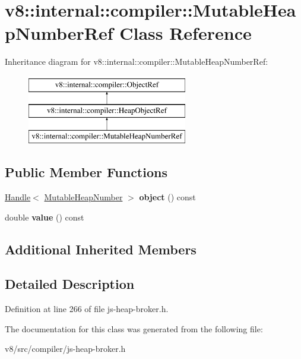 \hypertarget{classv8_1_1internal_1_1compiler_1_1MutableHeapNumberRef}{}\section{v8\+:\+:internal\+:\+:compiler\+:\+:Mutable\+Heap\+Number\+Ref Class Reference}
\label{classv8_1_1internal_1_1compiler_1_1MutableHeapNumberRef}
Inheritance diagram for v8\+:\+:internal\+:\+:compiler\+:\+:Mutable\+Heap\+Number\+Ref\+:\begin{figure}[H]
\begin{center}
\leavevmode
\includegraphics[height=3.000000cm]{classv8_1_1internal_1_1compiler_1_1MutableHeapNumberRef}
\end{center}
\end{figure}
\subsection*{Public Member Functions}
\begin{DoxyCompactItemize}
\item 
\mbox{\label{classv8_1_1internal_1_1compiler_1_1MutableHeapNumberRef_aad6b2d9d1c2614e7e510ed9981f96719}} 
\mbox{\hyperlink{classv8_1_1internal_1_1Handle}{Handle}}$<$ \mbox{\hyperlink{classv8_1_1internal_1_1MutableHeapNumber}{Mutable\+Heap\+Number}} $>$ {\bfseries object} () const
\item 
\mbox{\label{classv8_1_1internal_1_1compiler_1_1MutableHeapNumberRef_ac210c1d846a53ba0b17dc53f1482e94c}} 
double {\bfseries value} () const
\end{DoxyCompactItemize}
\subsection*{Additional Inherited Members}


\subsection{Detailed Description}


Definition at line 266 of file js-\/heap-\/broker.\+h.



The documentation for this class was generated from the following file\+:\begin{DoxyCompactItemize}
\item 
v8/src/compiler/js-\/heap-\/broker.\+h\end{DoxyCompactItemize}
